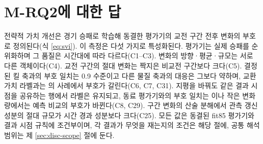 \section{M-RQ2에 대한 답}
\label{sec:value-answer}

전략적 가치 개선은 경기 승패로 학습해 동결한 평가기의 교전 구간 전후 변화의 부호로 정의된다(식 \eqref{eq:svi}). 이 측정은 다섯 가지로 특성화된다. 평가기는 실제 승패를 순위화하며 그 품질은 시간대에 따라 다르다(C1--C3). 변화의 방향·평균·규모는 서로 다른 객체이다(C4). 교전 구간의 절대 변화는 짝지은 비교전 구간보다 크다(C5). 결정된 킬 축과의 부호 일치는 0.9 수준이고 다른 물질 축과의 대응은 그보다 약하며, 교환가치 라벨과는 \meFlip{}의 사례에서 부호가 갈린다(C6, C7, C31). 지평을 바꿔도 같은 결과 시점을 공유하는 행에서 라벨은 유지되고, 동료 평가기와의 부호 일치는 \peerSignAgree{}이나 작은 변화량에서는 예측 비교의 부호가 바뀐다(C8, C29). 구간 변화의 산술 분해에서 관측 갱신 성분의 절대 규모가 시간 경과 성분보다 크다(C25). 모든 값은 동결된 fit85 평가기와 결과 시점 규칙에 조건부이며, 각 결과가 무엇을 재는지의 조건은 해당 절에, 공통 해석 범위는 제 \ref{sec:disc-scope} 절에 둔다.
